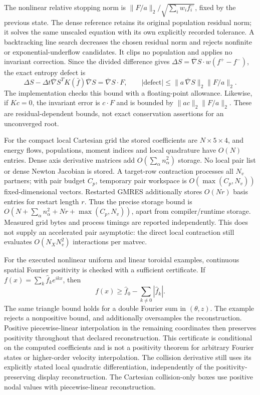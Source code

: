 \documentclass[11pt,letterpaper]{article}
\begin{document}
The nonlinear relative stopping norm is
$\|F/a\|_2/\sqrt{\sum_i w_if_i^-}$, fixed by the previous state.
The dense reference retains its original population residual norm; it solves
the same unscaled equation with its own explicitly recorded tolerance.
A backtracking line search decreases the chosen residual norm and rejects
nonfinite or exponential-underflow candidates. It clips no population and
applies no invariant correction.
Since the divided difference gives
$\Delta S=\overline\nabla S\cdot w(f^+-f^-)$, the exact entropy defect is
\begin{equation}
 \Delta S-\Delta t\overline\nabla S^TK(\bar f)\overline\nabla S
 =\overline\nabla S\cdot F,
 \qquad
 |\mathrm{defect}|\le
 \|a\,\overline\nabla S\|_2\|F/a\|_2.
 \label{eq:entropyresidualbound}
\end{equation}
The implementation checks this bound with a floating-point allowance.
Likewise, if $Kc=0$, the invariant error is $c\cdot F$ and is bounded by
$\|ac\|_2\|F/a\|_2$. These are residual-dependent bounds, not exact
conservation assertions for an unconverged root.

For the compact local Cartesian grid the stored coefficients are
$N\times5\times4$, and energy flows, populations, moment indices and local
quadrature have $O(N)$ entries. Dense axis derivative matrices add
$O(\sum_\alpha n_\alpha^2)$ storage. No local pair list or dense Newton
Jacobian is stored. A target-row contraction processes all $N_v$ partners;
with pair budget $C_p$, temporary pair workspace is
$O(\max(C_p,N_v))$ fixed-dimensional vectors. Restarted GMRES additionally
stores $O(Nr)$ basis entries for restart length $r$.
Thus the precise storage bound is
$O(N+\sum_\alpha n_\alpha^2+Nr+\max(C_p,N_v))$, apart from compiler/runtime
storage. Measured grid bytes and process timings are reported independently.
This does not supply an accelerated pair asymptotic: the direct local
contraction still evaluates $O(N_XN_v^2)$ interactions per matvec.

For the executed nonlinear uniform and linear toroidal examples, continuous
spatial Fourier positivity is checked with a sufficient certificate. If
$f(x)=\sum_k\widehat f_k e^{ikx}$, then
\begin{equation}
 f(x)\ge\widehat f_0-\sum_{k\ne0}|\widehat f_k|.
\end{equation}
The same triangle bound holds for a double Fourier sum in $(\theta,z)$.
The example rejects a nonpositive bound, and additionally oversamples the
reconstruction. Positive piecewise-linear interpolation in the remaining
coordinates then preserves positivity throughout that declared reconstruction.
This certificate is conditional on the computed coefficients and is not a
positivity theorem for arbitrary Fourier states or higher-order velocity
interpolation. The collision derivative still uses its explicitly stated local
quadratic differentiation, independently of the positivity-preserving display
reconstruction. The Cartesian collision-only boxes use positive nodal values
with piecewise-linear reconstruction.
\end{document}
